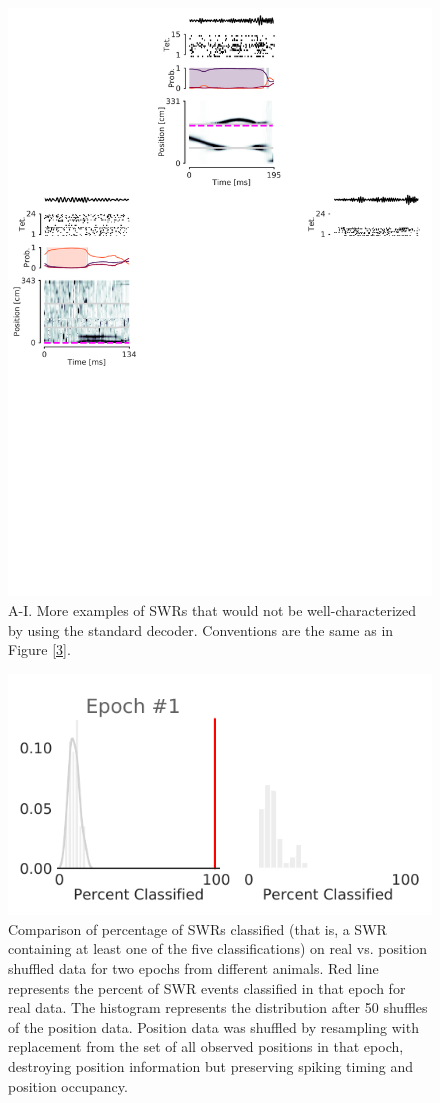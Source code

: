 \documentclass[times, twoside]{zHenriquesLab-StyleBioRxiv}
\begin{document}
\begin{figure}%
\centering
\includegraphics[width=0.80\linewidth]{figures/Figure3-supplemental1/Figure3_v4_supplemental1}
\caption{A-I. More examples of SWRs that would not be well-characterized by using the standard decoder. Conventions are the same as in Figure \ref{3}.
}
\label{fig:Figure3-Figure supplement 1}
\end{figure}

\begin{figure}%
\centering
\includegraphics[width=0.80\linewidth]{figures/Figure3-supplemental2/Figure3_v2-supplemental2}
\caption{Comparison of percentage of SWRs classified (that is, a SWR containing at least one of the five classifications) on real vs. position shuffled data for two epochs from different animals. Red line represents the percent of SWR events classified in that epoch for real data. The histogram represents the distribution after 50 shuffles of the position data. Position data was shuffled by resampling with replacement from the set of all observed positions in that epoch, destroying position information but preserving spiking timing and position occupancy.}
\label{fig:Figure3-Figure supplement 2}
\end{figure}
\end{document}

